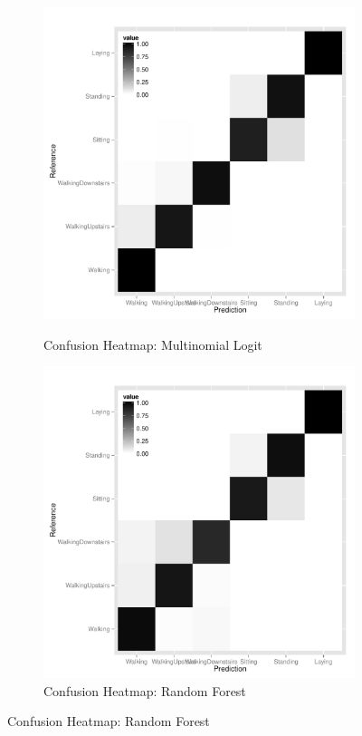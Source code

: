 \begin{landscape}
\begin{figure}
  \centering
  \begin{subfigure}[b]{0.45\textwidth}
    \caption{Confusion Heatmap: Multinomial Logit}
    \includegraphics[width=\textwidth]{heatmap_dmr.pdf}
    \label{fig:heatmap_dmr}
  \end{subfigure}
  \hfill
  \begin{subfigure}[b]{0.45\textwidth}
    \caption{Confusion Heatmap: Random Forest}
    \includegraphics[width=\textwidth]{heatmap_rf.pdf}

\end{subfigure}
\end{figure}
\end{landscape}
